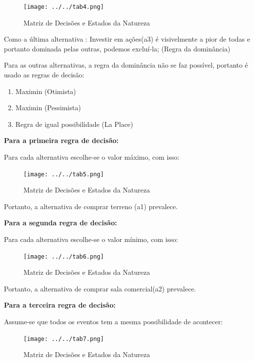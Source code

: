 \documentclass[
	12pt,				%
	openright,			%
	oneside,			%
	a4paper,			%
	english,			%
	french,				%
	spanish,			%
	brazil				%
	]{abntex2}
\begin{document}
\begin{figure}[H] \centering 
\caption{Matriz de Decisões e Estados da Natureza}
\texttt{[image: ../../tab4.png]}
\label{tab4}
\end{figure}

Como a última alternativa : Investir em ações(a3) é visivelmente a pior de todas e portanto dominada pelas outras, podemos excluí-la; (Regra da dominância)

Para as outras alternativas, a regra da dominância não se faz possível, portanto é usado as regras de decisão:

\begin{enumerate}
\item Maximin (Otimista)
\item Maximin (Pessimista)
\item Regra de igual possibilidade (La Place)
\end{enumerate}

\textbf{Para a primeira regra de decisão:}

Para cada alternativa escolhe-se o valor máximo, com isso:

\begin{figure}[H] \centering 
\caption{Matriz de Decisões e Estados da Natureza}
\texttt{[image: ../../tab5.png]}
\label{tab5}
\end{figure}

Portanto, a alternativa de comprar terreno (a1) prevalece.

\textbf{Para a segunda regra de decisão:}

Para cada alternativa escolhe-se o valor mínimo, com isso:

\begin{figure}[H] \centering 
\caption{Matriz de Decisões e Estados da Natureza}
\texttt{[image: ../../tab6.png]}
\label{tab6}
\end{figure}

Portanto, a alternativa de comprar sala comercial(a2) prevalece.

\textbf{Para a terceira regra de decisão:}

Assume-se que todos os eventos tem a mesma possibilidade de acontecer:

\begin{figure}[H] \centering 
\caption{Matriz de Decisões e Estados da Natureza}
\texttt{[image: ../../tab7.png]}
\label{tab7}
\end{figure}
\end{document}
